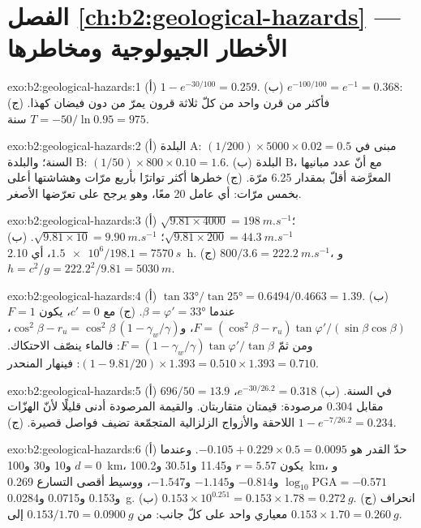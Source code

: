 \section*{الفصل \ref{ch:b2:geological-hazards} --- الأخطار الجيولوجية ومخاطرها}

\begin{solution}{exo:b2:geological-hazards:1}
(أ) $1 - e^{-30/100} = 0.259$. (ب) $e^{-100/100} = e^{-1} = 0.368$: فأكثر من قرن واحد من كلّ ثلاثة قرون
يمرّ من دون فيضان كهذا. (ج) $T = -50/\ln 0.95 = 975$ سنة.
\end{solution}

\begin{solution}{exo:b2:geological-hazards:2}
(أ) البلدة A: $(1/200) \times 5000 \times 0.02 = 0.5$ مبنى في السنة؛ والبلدة B: $(1/50) \times 800
\times 0.10 = 1.6$. (ب) البلدة B، مع أنّ عدد مبانيها المعرَّضة أقلّ بمقدار 6.25 مرّة. (ج) خطرها أكثر تواترًا
بأربع مرّات وهشاشتها أعلى بخمس مرّات: أي عامل 20 معًا، وهو يرجح على
تعرّضها الأصغر.
\end{solution}

\begin{solution}{exo:b2:geological-hazards:3}
(أ) $\sqrt{9.81 \times 4000} = \qty{198}{m.s^{-1}}$؛ $\sqrt{9.81 \times 200} = \qty{44.3}{m.s^{-1}}$؛
$\sqrt{9.81 \times 10} = \qty{9.90}{m.s^{-1}}$. (ب) $\num{1.5e6}/198.1 = \qty{7570}{s}$، أي \qty{2.10}{h}.
(ج) $800/3.6 = \qty{222.2}{m.s^{-1}}$، و$h = c^2/g = 222.2^2/9.81 = \qty{5030}{m}$.
\end{solution}

\begin{solution}{exo:b2:geological-hazards:4}
(أ) $\tan\ang{33}/\tan\ang{25} = 0.6494/0.4663 = 1.39$. (ب) $F = 1$ عندما $\beta = \varphi' =
\ang{33}$. (ج) مع $c' = 0$، يكون $F = (\cos^2\beta - r_u)\tan\varphi'/(\sin\beta\cos\beta)$، و$\cos^2\beta
- r_u = \cos^2\beta\,(1 - \gamma_w/\gamma)$، ومن ثمّ $F = (1 - \gamma_w/\gamma)\tan\varphi'/\tan\beta$:
فالماء ينصّف الاحتكاك. $(1 - 9.81/20) \times 1.393 = 0.510 \times 1.393 = 0.710$: فينهار
المنحدر.
\end{solution}

\begin{solution}{exo:b2:geological-hazards:5}
(أ) $696/50 = 13.9$ في السنة. (ب) $e^{-30/26.2} = 0.318$، مقابل 0.304 مرصودة: قيمتان متقاربتان. والقيمة
المرصودة أدنى قليلًا لأنّ الهزّات اللاحقة والأزواج الزلزالية المتجمّعة تضيف فواصل
قصيرة. (ج) $1 - e^{-7/26.2} = 0.234$.
\end{solution}

\begin{solution}{exo:b2:geological-hazards:6}
(أ) حدّ القدر هو $-0.105 + 0.229 \times 0.5 = 0.0095$. وعندما $d = 0$ و10 و30
و\qty{100}{km}، يكون $r = 5.57$ و11.45 و30.51 و\qty{100.2}{km}، و$\log_{10}\mathrm{PGA} = -0.571$
و$-0.814$ و$-1.145$ و$-1.547$، ووسيط أقصى التسارع 0.269 و0.153 و0.0715 و\qty{0.0284}{g}.
(ب) $0.153 \times 10^{0.251} = 0.153 \times 1.78 = \qty{0.272}{g}$. (ج) انحراف معياري واحد
على كلّ جانب: من $0.153/1.70 = \qty{0.0900}{g}$ إلى $0.153 \times 1.70 = \qty{0.260}{g}$.
\end{solution}

